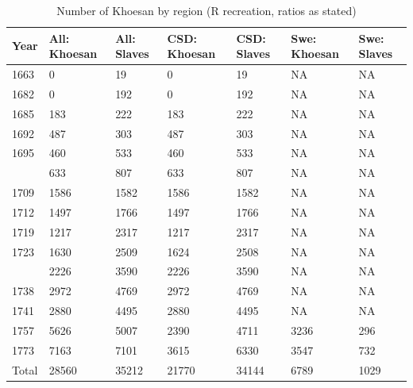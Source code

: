 \begin{table}

\caption{Number of Khoesan by region (R recreation, ratios as stated)}
\centering
\begin{tabular}[t]{lllllll}
\toprule
Year & All: Khoesan & All: Slaves & CSD: Khoesan & CSD: Slaves & Swe: Khoesan & Swe: Slaves\\
\midrule
1663 & 0 & 19 & 0 & 19 & NA & NA\\
1682 & 0 & 192 & 0 & 192 & NA & NA\\
1685 & 183 & 222 & 183 & 222 & NA & NA\\
1692 & 487 & 303 & 487 & 303 & NA & NA\\
1695 & 460 & 533 & 460 & 533 & NA & NA\\
\addlinespace
1700 & 633 & 807 & 633 & 807 & NA & NA\\
1709 & 1586 & 1582 & 1586 & 1582 & NA & NA\\
1712 & 1497 & 1766 & 1497 & 1766 & NA & NA\\
1719 & 1217 & 2317 & 1217 & 2317 & NA & NA\\
1723 & 1630 & 2509 & 1624 & 2508 & NA & NA\\
\addlinespace
1731 & 2226 & 3590 & 2226 & 3590 & NA & NA\\
1738 & 2972 & 4769 & 2972 & 4769 & NA & NA\\
1741 & 2880 & 4495 & 2880 & 4495 & NA & NA\\
1757 & 5626 & 5007 & 2390 & 4711 & 3236 & 296\\
1773 & 7163 & 7101 & 3615 & 6330 & 3547 & 732\\
\addlinespace
Total & 28560 & 35212 & 21770 & 34144 & 6789 & 1029\\
\bottomrule
\end{tabular}
\end{table}

